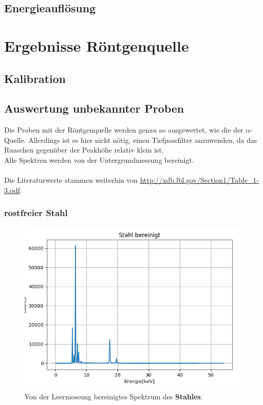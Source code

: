 \documentclass[12pt,a4paper]{article}
\begin{document}
\subsection{Energieauflösung}
\section{Ergebnisse Röntgenquelle}
\subsection{Kalibration}

\subsection{Auswertung unbekannter Proben}
Die Proben mit der Röntgenquelle werden genau so ausgewertet, wie die der $\alpha$-Quelle. Allerdings ist es hier nicht nötig, einen Tiefpassfilter anzuwenden, da das Ruaschen gegenüber der Peakhöhe relativ klein ist.\\
Alle Spektren werden von der Untergrundmessung bereinigt.\\
\\
Die Literaturwerte stammen weiterhin von \url{http://xdb.lbl.gov/Section1/Table_1-3.pdf}.

\newpage
\subsubsection{rostfreier Stahl}
\begin{figure}[H]
\centering
\includegraphics[scale=1]{Bilder/roentgen_spektren/stahl_0.png}
\caption{Von der Leermessung bereinigtes Spektrum des \textbf{Stahles}.}
\label{fig:prop_stahl}
\end{figure}
\end{document}
